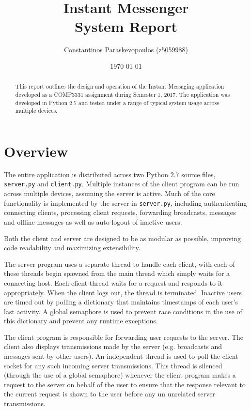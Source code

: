 \documentclass[12pt,a4paper]{article}
\title{Instant Messenger \\ \large System Report}
\author{Constantinos Paraskevopoulos (z5059988)}
\date{\today}
\begin{document}
\maketitle

\begin{abstract}
	This report outlines the design and operation of the Instant Messaging application developed as a COMP3331 assignment during Semester 1, 2017. The application was developed in Python 2.7 and tested under a range of typical system usage across multiple devices.
\end{abstract}

\section{Overview}
\label{sec:overview}

The entire application is distributed across two Python 2.7 source files, \verb|server.py| and \verb|client.py|. Multiple instances of the client program can be run across multiple devices, assuming the server is active. Much of the core functionality is implemented by the server in \verb|server.py|, including authenticating connecting clients, processing client requests, forwarding broadcasts, messages and offline messages as well as auto-logout of inactive users.

Both the client and server are designed to be as modular as possible, improving code readability and maximizing extensibility.

The server program uses a separate thread to handle each client, with each of these threads begin spawned from the main thread which simply waits for a connecting host. Each client thread waits for a request and responds to it appropriately. When the client logs out, the thread is terminated. Inactive users are timed out by polling a dictionary that maintains timestamps of each user's last activity. A global semaphore is used to prevent race conditions in the use of this dictionary and prevent any runtime exceptions.

The client program is responsible for forwarding user requests to the server. The client also displays transmissions made by the server (e.g. broadcasts and messages sent by other users). An independent thread is used to poll the client socket for any such incoming server transmissions. This thread is silenced (through the use of a global semaphore) whenever the client program makes a request to the server on behalf of the user to ensure that the response relevant to the current request is shown to the user before any un unrelated server transmissions.
\end{document}
